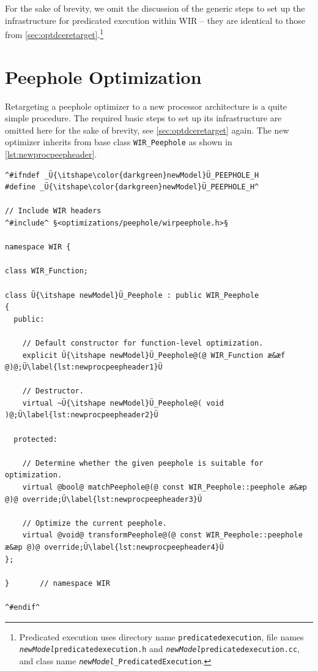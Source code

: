 For the sake of brevity, we omit the discussion of the generic steps to set up the infrastructure for predicated execution within \gls{WIR} -- they are identical to those from \cref{sec:optdceretarget}.\footnote{Predicated execution uses directory name \texttt{predicatedexecution}, file names \texttt{{\itshape newModel}predicatedexecution.h} and \texttt{{\itshape newModel}\-predicatedexecution.cc}, and class name \texttt{{\itshape newModel}\_PredicatedExecution}.}


\section{Peephole Optimization}
\label{sec:optpeepretarget}

Retargeting a peephole optimizer to a new processor architecture is a quite simple procedure.
The required basic steps to set up its infrastructure are omitted here for the sake of brevity, see \cref{sec:optdceretarget} again.
The new optimizer inherits from base class \texttt{WIR\_Peephole} as shown in \cref{lst:newprocpeepheader}.

\begin{lstlisting}[style=code,float=!t,caption={Header File for a New Processor Model's Peephole Optimization},label=lst:newprocpeepheader]
^#ifndef _Ü{\itshape\color{darkgreen}newModel}Ü_PEEPHOLE_H
#define _Ü{\itshape\color{darkgreen}newModel}Ü_PEEPHOLE_H^

// Include WIR headers
^#include^ §<optimizations/peephole/wirpeephole.h>§

namespace WIR {

class WIR_Function;

class Ü{\itshape newModel}Ü_Peephole : public WIR_Peephole
{
  public:

    // Default constructor for function-level optimization.
    explicit Ü{\itshape newModel}Ü_Peephole@(@ WIR_Function æ&æf @)@;Ü\label{lst:newprocpeepheader1}Ü

    // Destructor.
    virtual ~Ü{\itshape newModel}Ü_Peephole@( void )@;Ü\label{lst:newprocpeepheader2}Ü

  protected:

    // Determine whether the given peephole is suitable for optimization.
    virtual @bool@ matchPeephole@(@ const WIR_Peephole::peephole æ&æp @)@ override;Ü\label{lst:newprocpeepheader3}Ü

    // Optimize the current peephole.
    virtual @void@ transformPeephole@(@ const WIR_Peephole::peephole æ&æp @)@ override;Ü\label{lst:newprocpeepheader4}Ü
};

}       // namespace WIR

^#endif^
\end{lstlisting}

